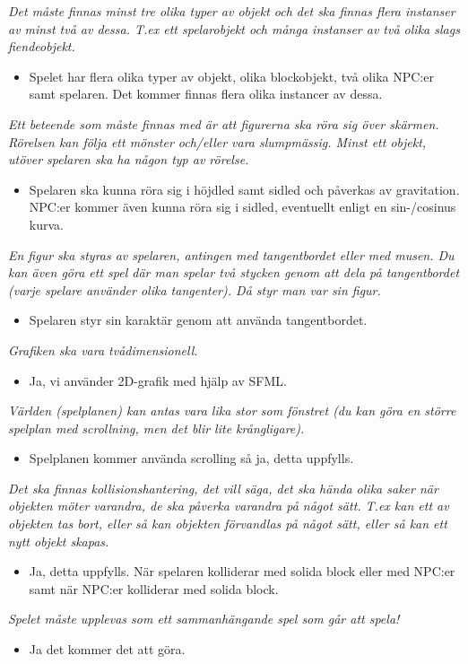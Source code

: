 \documentclass{TDP003mall}
\begin{document}
\noindent\textit{Det måste finnas minst tre olika typer av objekt och det ska finnas flera instanser av minst två av dessa.
T.ex ett spelarobjekt och många instanser av två olika slags fiendeobjekt.}
\begin{itemize}
\item Spelet har flera olika typer av objekt, olika blockobjekt, två olika NPC:er samt spelaren. Det kommer finnas flera olika instancer av dessa.
\end{itemize}

\noindent\textit{Ett beteende som måste finnas med är att figurerna ska röra sig över skärmen. Rörelsen kan följa ett
mönster och/eller vara slumpmässig. Minst ett objekt, utöver spelaren ska ha någon typ av rörelse.}
\begin{itemize}
\item Spelaren ska kunna röra sig i höjdled samt sidled och påverkas av gravitation. NPC:er kommer även kunna röra sig i sidled, eventuellt enligt en sin-/cosinus kurva.
\end{itemize}

\noindent\textit{En figur ska styras av spelaren, antingen med tangentbordet eller med musen. Du kan även göra ett spel där
man spelar två stycken genom att dela på tangentbordet (varje spelare använder olika tangenter). Då styr
man var sin figur.}
\begin{itemize}
\item Spelaren styr sin karaktär genom att använda tangentbordet.
\end{itemize}

\noindent\textit{Grafiken ska vara tvådimensionell.}
\begin{itemize}
\item Ja, vi använder 2D-grafik med hjälp av SFML.
\end{itemize}

\noindent\textit{Världen (spelplanen) kan antas vara lika stor som fönstret (du kan göra en större spelplan med scrollning,
men det blir lite krångligare).}
\begin{itemize}
\item Spelplanen kommer använda scrolling så ja, detta uppfylls.
\end{itemize}

\textit{Det ska finnas kollisionshantering, det vill säga, det ska hända olika saker när objekten möter varandra, 
de ska påverka varandra på något sätt. T.ex kan ett av objekten tas bort, eller så kan objekten förvandlas på
något sätt, eller så kan ett nytt objekt skapas.}
\begin{itemize}
\item Ja, detta uppfylls. När spelaren kolliderar med solida block eller med NPC:er samt när NPC:er kolliderar med solida block.
\end{itemize}

\noindent\textit{Spelet måste upplevas som ett sammanhängande spel som går att spela!}
\begin{itemize}
\item Ja det kommer det att göra.
\end{itemize}
\end{document}
